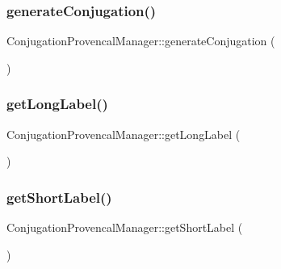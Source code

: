 \subsubsection{\texorpdfstring{generate\+Conjugation()}{generateConjugation()}}
{\footnotesize\ttfamily Conjugation\+Provencal\+Manager\+::generate\+Conjugation (\begin{DoxyParamCaption}{ }\end{DoxyParamCaption})}

\hypertarget{class_conjugation_provencal_manager_a9795549adf0ba2f9bded882cf85c792c}{}\label{class_conjugation_provencal_manager_a9795549adf0ba2f9bded882cf85c792c} 
\subsubsection{\texorpdfstring{get\+Long\+Label()}{getLongLabel()}}
{\footnotesize\ttfamily Conjugation\+Provencal\+Manager\+::get\+Long\+Label (\begin{DoxyParamCaption}{ }\end{DoxyParamCaption})}

\hypertarget{class_conjugation_provencal_manager_acfdf3d08b4e9787cd9fac2e9eea042ba}{}\label{class_conjugation_provencal_manager_acfdf3d08b4e9787cd9fac2e9eea042ba} 
\subsubsection{\texorpdfstring{get\+Short\+Label()}{getShortLabel()}}
{\footnotesize\ttfamily Conjugation\+Provencal\+Manager\+::get\+Short\+Label (\begin{DoxyParamCaption}{ }\end{DoxyParamCaption})}

\hypertarget{class_conjugation_provencal_manager_ab54b1aaa7e39d3f31d416640322eae5a}{}\label{class_conjugation_provencal_manager_ab54b1aaa7e39d3f31d416640322eae5a} 
